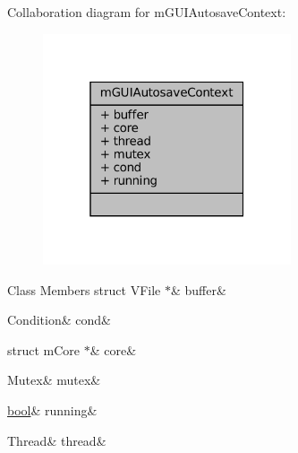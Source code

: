 Collaboration diagram for m\+G\+U\+I\+Autosave\+Context\+:
\nopagebreak
\begin{figure}[H]
\begin{center}
\leavevmode
\includegraphics[width=208pt]{structm_g_u_i_autosave_context__coll__graph}
\end{center}
\end{figure}
\begin{DoxyFields}{Class Members}
\mbox{\label{gui-runner_8h_aeda880ec961fb96942c204461a85e927}} 
struct VFile $\ast$&
buffer&
\\
\hline

\mbox{\label{gui-runner_8h_a5063e1983e50f46260059055e98ae2f0}} 
Condition&
cond&
\\
\hline

\mbox{\label{gui-runner_8h_a40c414a2080811c2e5b9dbc48f63f039}} 
struct mCore $\ast$&
core&
\\
\hline

\mbox{\label{gui-runner_8h_aede38b4d34982e1850a547ec09e8a003}} 
Mutex&
mutex&
\\
\hline

\mbox{\label{gui-runner_8h_a562e2016dd4f2d0a60b4fb8ce592c9dd}} 
\mbox{\hyperlink{libretro_8h_a4a26dcae73fb7e1528214a068aca317e}{bool}}&
running&
\\
\hline

\mbox{\label{gui-runner_8h_a358e2ebdb22e01ac230979c936419762}} 
Thread&
thread&
\\
\hline

\end{DoxyFields}


